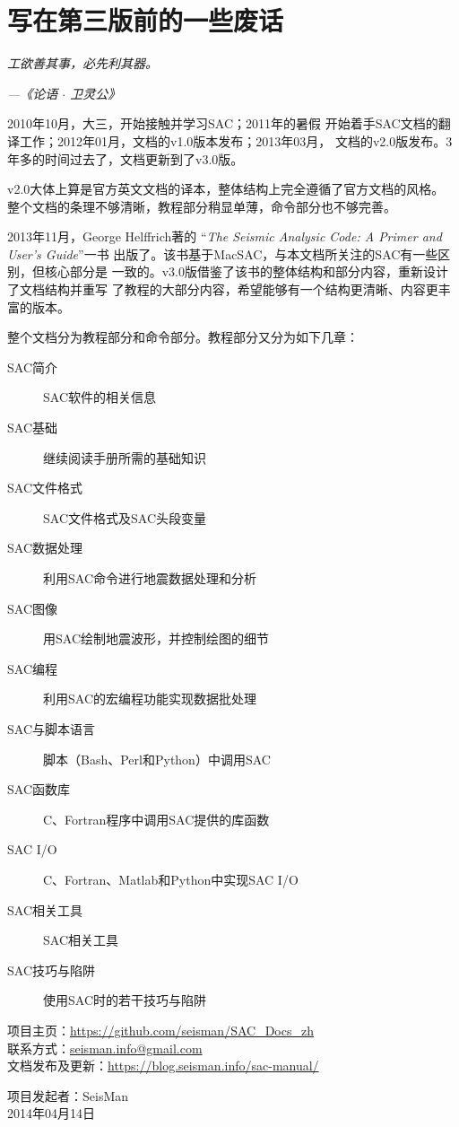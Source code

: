 {\section*{写在第三版前的一些废话}}

\begin{shadequote*}
\Large\emph{工欲善其事，必先利其器。}
\par\hfill\emph{\normalsize---《论语 $\cdot$ 卫灵公》}
\end{shadequote*}

2010年10月，大三，开始接触并学习SAC；2011年的暑假
开始着手SAC文档的翻译工作；2012年01月，文档的v1.0版本发布；2013年03月，
文档的v2.0版发布。3年多的时间过去了，文档更新到了v3.0版。

v2.0大体上算是官方英文文档的译本，整体结构上完全遵循了官方文档的风格。
整个文档的条理不够清晰，教程部分稍显单薄，命令部分也不够完善。

2013年11月，George Helffrich著的
``\emph{The Seismic Analysic Code: A Primer and User's Guide}''一书
出版了。该书基于MacSAC，与本文档所关注的SAC有一些区别，但核心部分是
一致的。v3.0版借鉴了该书的整体结构和部分内容，重新设计了文档结构并重写
了教程的大部分内容，希望能够有一个结构更清晰、内容更丰富的版本。

整个文档分为教程部分和命令部分。教程部分又分为如下几章：
\begin{description}
\item[SAC简介] SAC软件的相关信息
\item[SAC基础] 继续阅读手册所需的基础知识
\item[SAC文件格式] SAC文件格式及SAC头段变量
\item[SAC数据处理] 利用SAC命令进行地震数据处理和分析
\item[SAC图像] 用SAC绘制地震波形，并控制绘图的细节
\item[SAC编程] 利用SAC的宏编程功能实现数据批处理
\item[SAC与脚本语言] 脚本（Bash、Perl和Python）中调用SAC
\item[SAC函数库] C、Fortran程序中调用SAC提供的库函数
\item[SAC I/O] C、Fortran、Matlab和Python中实现SAC I/O
\item[SAC相关工具] SAC相关工具
\item[SAC技巧与陷阱] 使用SAC时的若干技巧与陷阱
\end{description}

\begin{flushleft}
项目主页：\url{https://github.com/seisman/SAC_Docs_zh}      \\
联系方式：\url{seisman.info@gmail.com}                      \\
文档发布及更新：\url{https://blog.seisman.info/sac-manual/}   \\
\end{flushleft}

\begin{flushright}
项目发起者：SeisMan \\
2014年04月14日
\end{flushright}
